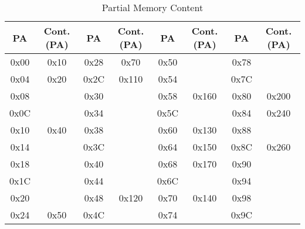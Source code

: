 \begin{table}[ht]
    \begin{minipage}{\textwidth}
        \centering
        \caption{Partial Memory Content}
        \label{tab:Memory}
        \setlength{\tabcolsep}{10pt}
        \renewcommand{\arraystretch}{1.3}
        \begin{tabular}{|c|c||c|c||c|c||c|c|}
            \hline
            \textbf{PA} & \textbf{Cont. (PA)} & \textbf{PA} & \textbf{Cont. (PA)} & \textbf{PA} & \textbf{Cont. (PA)} & \textbf{PA} & \textbf{Cont. (PA)} \\
            \hline
            0x00        & 0x10                & 0x28        & 0x70                & 0x50        &                     & 0x78        &                     \\
            \hline
            0x04        & 0x20                & 0x2C        & 0x110               & 0x54        &                     & 0x7C        &                     \\
            \hline
            0x08        &                     & 0x30        &                     & 0x58        & 0x160               & 0x80        & 0x200               \\
            \hline
            0x0C        &                     & 0x34        &                     & 0x5C        &                     & 0x84        & 0x240               \\
            \hline
            0x10        & 0x40                & 0x38        &                     & 0x60        & 0x130               & 0x88        &                     \\
            \hline
            0x14        &                     & 0x3C        &                     & 0x64        & 0x150               & 0x8C        & 0x260               \\
            \hline
            0x18        &                     & 0x40        &                     & 0x68        & 0x170               & 0x90        &                     \\
            \hline
            0x1C        &                     & 0x44        &                     & 0x6C        &                     & 0x94        &                     \\
            \hline
            0x20        &                     & 0x48        & 0x120               & 0x70        & 0x140               & 0x98        &                     \\
            \hline
            0x24        & 0x50                & 0x4C        &                     & 0x74        &                     & 0x9C        &                     \\
            \hline
        \end{tabular}
    \end{minipage}
\end{table}

